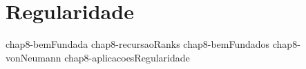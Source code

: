 \chapter{Regularidade}

{chap8-bemFundada}
{chap8-recursaoRanks}
{chap8-bemFundados}
{chap8-vonNeumann}
{chap8-aplicacoesRegularidade}